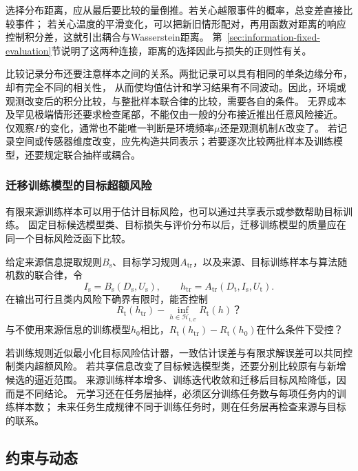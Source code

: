 选择分布距离，应从最后要比较的量倒推。若关心越限事件的概率，总变差直接比较事件；
若关心温度的平滑变化，可以把新旧情形配对，再用函数对距离的响应控制积分差，这就引出耦合与Wasserstein距离。
第~\ref{sec:information-fixed-evaluation}节说明了这两种连接，距离的选择因此与损失的正则性有关。

比较记录分布还要注意样本之间的关系。两批记录可以具有相同的单条边缘分布，却有完全不同的相关性，
从而使均值估计和学习结果有不同波动。因此，环境或观测改变后的积分比较，与整批样本联合律的比较，需要各自的条件。
无界成本及罕见极端情形还要求检查尾部，不能仅由一般的分布接近推出任意风险接近。
仅观察$P$的变化，通常也不能唯一判断是环境频率$\mu$还是观测机制$K$改变了。
若记录空间或传感器维度改变，应先构造共同表示；若要逐次比较两批样本及训练模型，还要规定联合抽样或耦合。

\subsubsection{迁移训练模型的目标超额风险}
\label{sec:future-analysis-transfer-excess-risk}

有限来源训练样本可以用于估计目标风险，也可以通过共享表示或参数帮助目标训练。
固定目标候选模型类、目标损失与评价分布以后，迁移训练模型的质量应在同一个目标风险泛函下比较。

\begin{mathproblem}[迁移训练模型与目标最佳候选的风险差]
  \label{question:future-transfer-excess-risk}
  给定来源信息提取规则$B_{\mathrm s}$、目标学习规则$A_{\mathrm{tr}}$，以及来源、目标训练样本与算法随机数的联合律，令
  \[
    I_{\mathrm s}=B_{\mathrm s}(D_{\mathrm s},U_{\mathrm s}),\qquad
    h_{\mathrm{tr}}=A_{\mathrm{tr}}(D_{\mathrm t},I_{\mathrm s},U_{\mathrm t}).
  \]
  在输出可行且类内风险下确界有限时，能否控制
  \[
    R_{\mathrm t}(h_{\mathrm{tr}})-\inf_{h\in\mathcal H_{\mathrm t,\mathcal C}}R_{\mathrm t}(h)\text{？}
  \]
  与不使用来源信息的训练模型$h_0$相比，$R_{\mathrm t}(h_{\mathrm{tr}})-R_{\mathrm t}(h_0)$在什么条件下受控？
\end{mathproblem}

若训练规则近似最小化目标风险估计器，一致估计误差与有限求解误差可以共同控制类内超额风险。
若共享信息改变了目标候选模型类，还要分别比较原有与新增候选的逼近范围。
来源训练样本增多、训练迭代收敛和迁移后目标风险降低，因而是不同结论。
元学习还在任务层抽样，必须区分训练任务数与每项任务内的训练样本数；
未来任务生成规律不同于训练任务时，则在任务层再检查来源与目标的联系。

\subsection{约束与动态}
\label{sec:future-feedback-theory-map}

